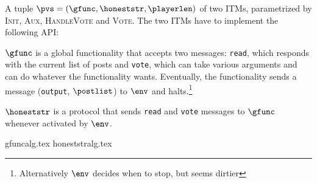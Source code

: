 \begin{definition}
  A tuple $\pvs = \left(\gfunc, \honeststr, \playerlen\right)$ of two ITMs,
  parametrized by \textsc{Init}, \textsc{Aux}, \textsc{HandleVote} and
  \textsc{Vote}. The two ITMs have to implement the following API:

  $\gfunc$ is a global functionality that accepts two messages:
  \texttt{read}, which responds with the current list of posts and
  \texttt{vote}, which can take various arguments and can do whatever the
  functionality wants. Eventually, the functionality sends a message
  (\texttt{output}, $\postlist$) to $\env$ and halts.\footnote{Alternatively
  $\env$ decides when to stop, but seems dirtier}

  $\honeststr$ is a protocol that sends \texttt{read} and \texttt{vote}
  messages to $\gfunc$ whenever activated by $\env$.
\end{definition}
{gfuncalg.tex}
{honeststralg.tex}
